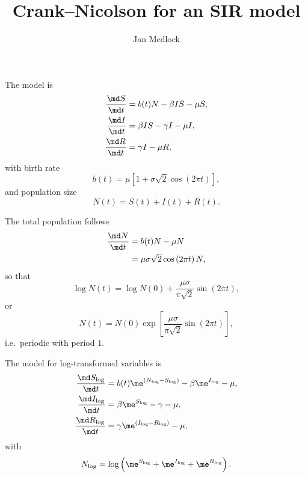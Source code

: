 \documentclass{jpmarticle}
\title{Crank--Nicolson for an SIR model}
\author{Jan Medlock}
\begin{document}
\maketitle

The model is
\begin{equation}
  \begin{split}
    \frac{\md S}{\md t} &= b(t) N - \beta I S - \mu S,
    \\
    \frac{\md I}{\md t} &= \beta I S - \gamma I - \mu I,
    \\
    \frac{\md R}{\md t} &= \gamma I - \mu R,
  \end{split}
\end{equation}
with birth rate
\begin{equation}
  b(t) = \mu \left[
    1 + \sigma \sqrt{2} \cos\left(2 \pi t\right)
  \right],
\end{equation}
and population size
\begin{equation}
  N(t) = S(t) + I(t) + R(t).
\end{equation}

The total population follows
\begin{equation}
  \begin{split}
    \frac{\md N}{\md t}
    &= b(t) N - \mu N
    \\
    &= \mu \sigma \sqrt{2} \cos\left(2 \pi t\right) N,
  \end{split}
\end{equation}
so that
\begin{equation}
  \log N(t) = \log N(0)
  + \frac{\mu \sigma}{\pi \sqrt{2}}
  \sin\left(2 \pi t\right),
\end{equation}
or
\begin{equation}
  N(t) = N(0) \exp\left[
    \frac{\mu \sigma}{\pi \sqrt{2}}
    \sin\left(2 \pi t\right)
  \right],
\end{equation}
i.e.~periodic with period $1$.

The model for log-transformed variables is
\begin{equation}
  \begin{split}
    \label{model_log}
    \frac{\md S_{\log}}{\md t}
    &= b(t) \me^{\left(N_{\log} - S_{\log}\right)}
    - \beta \me^{I_{\log}}
    - \mu,
    \\
    \frac{\md I_{\log}}{\md t}
    &= \beta \me^{S_{\log}} - \gamma - \mu,
    \\
    \frac{\md R_{\log}}{\md t}
    &= \gamma \me^{\left(I_{\log} - R_{\log}\right)}
    - \mu,
  \end{split}
\end{equation}
with
\begin{equation}
  N_{\log} = \log\left(
    \me^{S_{\log}} + \me^{I_{\log}} + \me^{R_{\log}}
  \right).
\end{equation}
\end{document}

